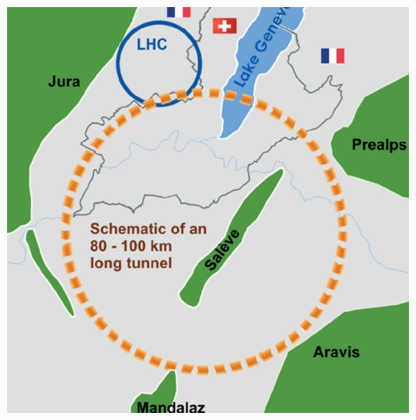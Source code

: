 \begin{frame}
\begin{columns}
    \centering
    \includegraphics[width=0.9\textwidth]{figures/FCC}

  \end{columns}

\end{frame}


